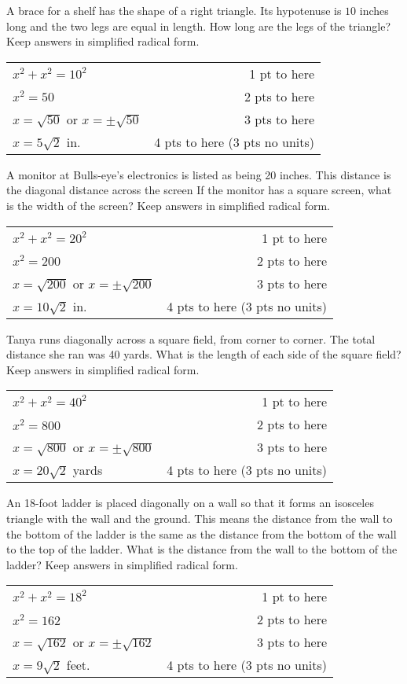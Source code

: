 {
	A brace for a shelf has the shape of a right triangle. Its hypotenuse is $10$ inches long and the two legs are equal in length. How long are the legs of the triangle? Keep answers in simplified radical form.
}
{
	\begin{tabular}{l r}
	$x^2+x^2 = 10^2$ & 1 pt to here\\
	$x^2=50$ & 2 pts to here\\
	$x=\sqrt{50}$ or $x=\pm \sqrt{50}$ & 3 pts to here\\
	$x=5\sqrt{2}$ in. & 4 pts to here (3 pts no units)
	\end{tabular}
}

{
	A monitor at Bulls-eye's electronics is listed as being 20 inches.  This distance is the diagonal 
distance across the screen  If the monitor has a square screen, what is the width of the screen?  Keep answers in simplified radical form.
}
{
	\begin{tabular}{l r}
	$x^2+x^2 = 20^2$ & 1 pt to here\\
	$x^2=200$ & 2 pts to here\\
	$x=\sqrt{200}$ or $x=\pm \sqrt{200}$ & 3 pts to here\\
	$x=10\sqrt{2}$ in. & 4 pts to here (3 pts no units)
	\end{tabular}
}

{
	Tanya runs diagonally across a square field, from corner to corner.  The total distance she ran was 40 yards.  What is the 
length of each side of the square field?  Keep answers in simplified radical form.
}
{
	\begin{tabular}{l r}
	$x^2+x^2 = 40^2$ & 1 pt to here\\
	$x^2=800$ & 2 pts to here\\
	$x=\sqrt{800}$ or $x=\pm \sqrt{800}$ & 3 pts to here\\
	$x=20\sqrt{2}$ yards & 4 pts to here (3 pts no units)
	\end{tabular}
}

{
	An 18-foot ladder is placed diagonally on a wall so that it forms an isosceles triangle with the wall and the ground.  This means the distance from the wall to the bottom of the ladder is the same as the distance from the bottom of the wall to the top of the ladder. What is the distance from the wall to the bottom of the ladder? Keep answers in simplified radical form.
}
{
	\begin{tabular}{l r}
	$x^2+x^2 = 18^2$ & 1 pt to here\\
	$x^2=162$ & 2 pts to here\\
	$x=\sqrt{162}$ or $x=\pm \sqrt{162}$ & 3 pts to here\\
	$x=9\sqrt{2}$ feet. & 4 pts to here (3 pts no units)
	\end{tabular}
}
